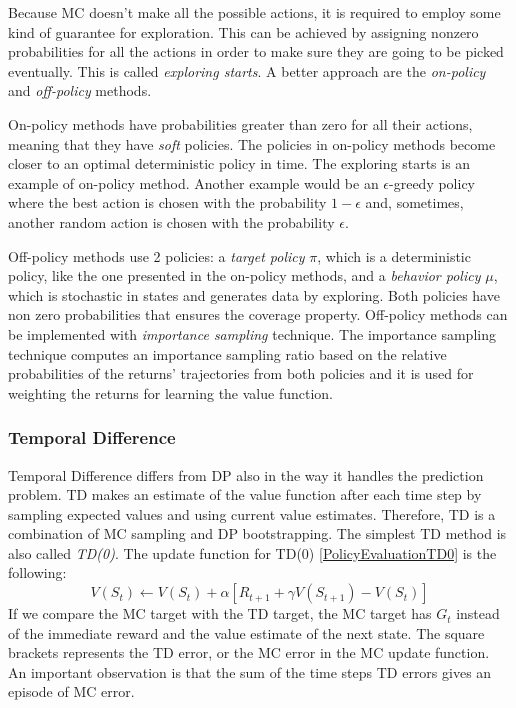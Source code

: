 Because MC doesn't make all the possible actions, it is required to employ some kind of guarantee for exploration. This can be achieved by assigning nonzero probabilities for all the actions in order to make sure they are going to be picked eventually. This is called \textit{exploring starts}. A better approach are the \textit{on-policy} and \textit{off-policy} methods. 

On-policy methods have probabilities greater than zero for all their actions, meaning that they have \textit{soft} policies. The policies in on-policy methods become closer to an optimal deterministic policy in time. The exploring starts is an example of on-policy method. Another example would be an $\epsilon$-greedy policy where the best action is chosen with the probability $1-\epsilon$ and, sometimes, another random action is chosen with the probability $\epsilon$.

Off-policy methods use 2 policies: a \textit{target policy} $\pi$, which is a deterministic policy, like the one presented in the on-policy methods, and a \textit{behavior policy} $\mu$, which is stochastic in states and generates data by exploring. Both policies have non zero probabilities that ensures the coverage property. Off-policy methods can be implemented with \textit{importance sampling} technique. The importance sampling technique computes an importance sampling ratio based on the relative probabilities of the returns' trajectories from both policies and it is used for weighting the returns for learning the value function.

\subsubsection{Temporal Difference}\label{Temporal Difference}
Temporal Difference differs from DP also in the way it handles the prediction problem. TD makes an estimate of the value function after each time step by sampling expected values and using current value estimates. Therefore, TD is a combination of MC sampling and DP bootstrapping. The simplest TD method is also called \textit{TD(0)}. The update function for TD(0) \ref{PolicyEvaluationTD0} is the following:
\begin{equation}\label{PolicyEvaluationTD0}
V(S_{t})\leftarrow V(S_{t})+\alpha \left [ R_{t+1}+\gamma V(S_{t+1})-V(S_{t}) \right ]
\end{equation}
If we compare the MC target with the TD target, the MC target has $G_{t}$ instead of the immediate reward and the value estimate of the next state. The square brackets represents the TD error, or the MC error in the MC update function. An important observation is that the sum of the time steps TD errors gives an episode of MC error.

